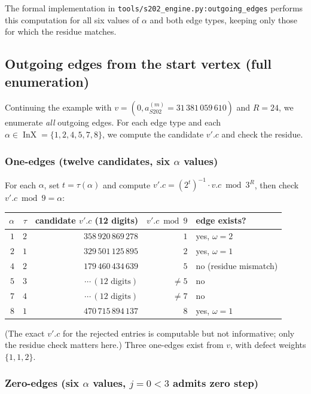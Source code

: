 \documentclass[11pt,a4paper]{article}
\theoremstyle{plain}
\theoremstyle{definition}
\newcommand{\aSat}{a_{S202}^{(m)}}
\DeclareMathOperator{\InX}{InX}
\begin{document}
The formal implementation in
\texttt{tools/s202\_engine.py:outgoing\_edges} performs this
computation for all six values of $\alpha$ and both edge types,
keeping only those for which the residue matches.

\subsection{Outgoing edges from the start vertex (full enumeration)}

Continuing the example with $v = (0, \aSat = 31\,381\,059\,610)$
and $R = 24$, we enumerate \emph{all} outgoing edges. For each
edge type and each $\alpha \in \InX = \{1, 2, 4, 5, 7, 8\}$, we
compute the candidate $v'.c$ and check the residue.

\subsubsection*{One-edges (twelve candidates, six $\alpha$ values)}

For each $\alpha$, set $t = \tau(\alpha)$ and compute
$v'.c = (2^t)^{-1} \cdot v.c \bmod 3^{R}$, then check
$v'.c \bmod 9 = \alpha$:

\begin{center}\footnotesize
\begin{tabular}{rrrr|l}
\toprule
$\alpha$ & $\tau$ & candidate $v'.c$ (12 digits) & $v'.c \bmod 9$ & edge exists? \\
\midrule
$1$ & $2$ & $358\,920\,869\,278$ & $1$ & yes, $\omega = 2$ \\
$2$ & $1$ & $329\,501\,125\,895$ & $2$ & yes, $\omega = 1$ \\
$4$ & $2$ & $179\,460\,434\,639$ & $5$ & no (residue mismatch) \\
$5$ & $3$ & $\cdots\,(\text{12 digits})$ & $\ne 5$ & no \\
$7$ & $4$ & $\cdots\,(\text{12 digits})$ & $\ne 7$ & no \\
$8$ & $1$ & $470\,715\,894\,137$ & $8$ & yes, $\omega = 1$ \\
\bottomrule
\end{tabular}
\end{center}

\noindent (The exact $v'.c$ for the rejected entries is computable
but not informative; only the residue check matters here.) Three
one-edges exist from $v$, with defect weights $\{1, 1, 2\}$.

\subsubsection*{Zero-edges (six $\alpha$ values, $j = 0 < 3$ admits zero step)}
\end{document}

